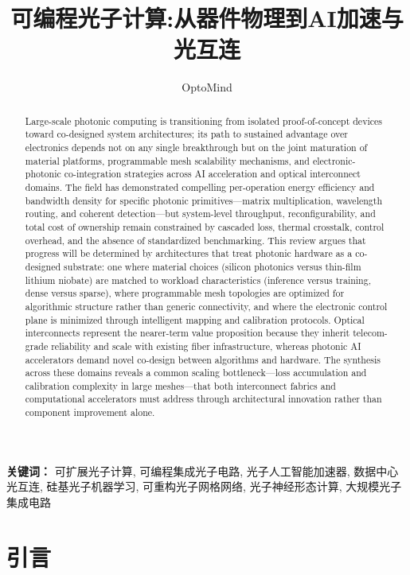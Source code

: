\documentclass[11pt]{article}
\title{可编程光子计算:从器件物理到AI加速与光互连}
\author{OptoMind}
\date{}
\begin{document}
\maketitle

\begin{abstract}
Large-scale photonic computing is transitioning from isolated proof-of-concept devices toward co-designed system architectures; its path to sustained advantage over electronics depends not on any single breakthrough but on the joint maturation of material platforms, programmable mesh scalability mechanisms, and electronic-photonic co-integration strategies across AI acceleration and optical interconnect domains. The field has demonstrated compelling per-operation energy efficiency and bandwidth density for specific photonic primitives---matrix multiplication, wavelength routing, and coherent detection---but system-level throughput, reconfigurability, and total cost of ownership remain constrained by cascaded loss, thermal crosstalk, control overhead, and the absence of standardized benchmarking. This review argues that progress will be determined by architectures that treat photonic hardware as a co-designed substrate: one where material choices (silicon photonics versus thin-film lithium niobate) are matched to workload characteristics (inference versus training, dense versus sparse), where programmable mesh topologies are optimized for algorithmic structure rather than generic connectivity, and where the electronic control plane is minimized through intelligent mapping and calibration protocols. Optical interconnects represent the nearer-term value proposition because they inherit telecom-grade reliability and scale with existing fiber infrastructure, whereas photonic AI accelerators demand novel co-design between algorithms and hardware. The synthesis across these domains reveals a common scaling bottleneck---loss accumulation and calibration complexity in large meshes---that both interconnect fabrics and computational accelerators must address through architectural innovation rather than component improvement alone.
\end{abstract}

\noindent\textbf{关键词：} 可扩展光子计算, 可编程集成光子电路, 光子人工智能加速器, 数据中心光互连, 硅基光子机器学习, 可重构光子网格网络, 光子神经形态计算, 大规模光子集成电路

\section{引言}\label{ux5f15ux8a00}
\end{document}
